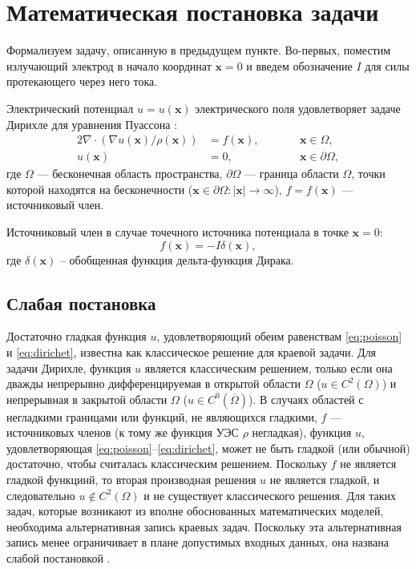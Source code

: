 \let\Omega\varOmega

\section{Математическая постановка задачи}

Формализуем задачу, описанную в предыдущем пункте. Во-первых, поместим излучающий электрод в начало координат ${\bm x = 0}$ и введем обозначение $I$ для силы протекающего через него тока.




Электрический потенциал ${u = u(\bm x)}$ электрического поля удовлетворяет задаче Дирихле для уравнения Пуассона \cite[с. 67]{elec}:
\begin{alignat}{2}
\nabla \cdot (\nabla u(\bm x) / \rho(\bm x)) &= f(\bm x),\qquad && \bm x \in \Omega, \label{eq:poisson}\\
u(\bm x) &= 0, && \bm x \in \partial \Omega, \label{eq:dirichet}
\end{alignat}
где $\Omega$ --- бесконечная область пространства, ${\partial \Omega}$ --- граница области $\Omega$, точки которой находятся на бесконечности (${\bm x \in \partial \Omega: |\bm x| \rightarrow \infty}$), ${f = f(\bm x)}$ --- источниковый член.

Источниковый член в случае точечного источника потенциала в точке ${\bm x = 0}$:
\begin{equation}
f(\bm x) = -I \delta(\bm x),
\end{equation}
где $\delta(\bm x)$ -- обобщенная функция дельта-функция Дирака.


\subsection{Слабая постановка}

Достаточно гладкая функция $u$, удовлетворяющий обеим равенствам \eqref{eq:poisson} и \eqref{eq:dirichet}, известна как классическое решение для краевой задачи. Для задачи Дирихле, функция $u$ является классическим решением, только если она дважды непрерывно дифференцируемая в открытой области $\Omega$ ($u \in C^2(\Omega)$) и непрерывная в закрытой области $\Omega$ ($u \in C^0(\overline \Omega)$). В случаях областей с негладкими границами или функций, не являющихся гладкими, $f$ --- источниковых членов (к тому же функция УЭС $\rho$ негладкая), функция $u$, удовлетворяющая \eqref{eq:poisson}--\eqref{eq:dirichet}, может не быть гладкой (или обычной) достаточно, чтобы считалась классическим решением. Поскольку $f$ не является гладкой функцинй, то вторая производная решения $u$ не является гладкой, и следовательно ${u \notin C^2(\Omega)}$ и не существует классического решения. Для таких задач, которые возникают из вполне обоснованных математических моделей, необходима альтернативная запись краевых задач. Поскольку эта альтернативная запись менее ограничивает в плане допустимых входных данных, она названа слабой постановкой \cite[с. 14]{FEFIS}.

